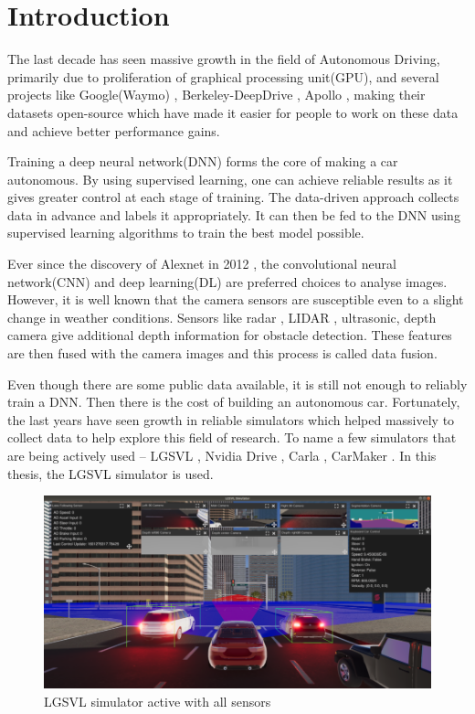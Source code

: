 \chapter{Introduction}

The last decade has seen massive growth in the field of Autonomous
Driving, primarily due to proliferation of graphical processing unit(GPU), and several projects like Google(Waymo) \cite{Waymo},
Berkeley-DeepDrive \cite{Berkeley-DeepDrive}, Apollo \cite{Apollo}, making their datasets
open-source which have made it easier for people to work on these data and achieve better performance gains.

Training a deep neural network(DNN) forms the core of making a car autonomous.
By using supervised learning, one can achieve reliable results as it gives greater control
at each stage of training. The data-driven approach collects data in advance and labels it
appropriately. It can then be fed to the DNN using supervised
learning algorithms to train the best model possible.

Ever since the discovery of Alexnet in 2012 \cite{Alexnet2012}, the convolutional neural network(CNN) and
deep learning(DL) are preferred choices to analyse images.  However, it is well known that the camera sensors are susceptible even to a slight change in weather conditions.
Sensors like radar \cite{Radar}, LIDAR \cite{LIDAR}, ultrasonic\cite{ultrasonic}, depth camera
give additional depth information for obstacle detection. These features are then fused
with the camera images and this process is called data fusion.

Even though there are some public data available, it is still not enough to reliably
train a DNN. Then there is  the cost of building an autonomous car. Fortunately, the last
years have seen growth in reliable simulators which
helped massively to collect data to help explore this field of research.
To name a few simulators that are being actively used -- LGSVL \cite{rong2020lgsvl}, Nvidia Drive
\cite{NvidiaSimulator}, Carla \cite{CarlaSimulator}, CarMaker \cite{CarMaker}.
In this thesis, the LGSVL simulator is used.

\begin{figure}[h]
    \begin{center}
        \includegraphics[width=\textwidth]{figures/png/intro/scrot_lgsvl_2.png}
    \end{center}
    \caption{LGSVL\cite{rong2020lgsvl} simulator active with all sensors}
        \label{fig:LGSVL_constellation_sensors}
\end{figure}

